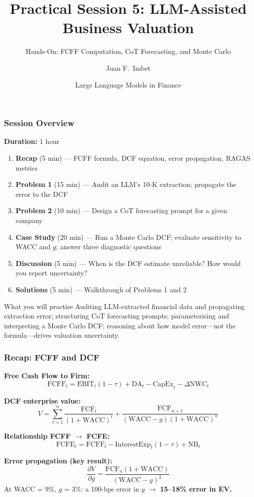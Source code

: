 \documentclass[9pt,t]{beamer}
\title{Practical Session 5: LLM-Assisted Business Valuation}
\subtitle{Hands-On: FCFF Computation, CoT Forecasting, and Monte Carlo}
\author{Juan F.\ Imbet}
\institute{Paris Dauphine -- PSL University}
\date{Large Language Models in Finance}
\begin{document}
\begin{frame}
\frametitle{}
\titlepage
\end{frame}

\begin{frame}
\frametitle{Session Overview}

\textbf{Duration:} 1 hour

\medskip
\begin{enumerate}
  \item \textbf{Recap} (5 min) --- FCFF formula, DCF equation, error propagation, RAGAS metrics
  \item \textbf{Problem 1} (15 min) --- Audit an LLM's 10-K extraction; propagate the error to the DCF
  \item \textbf{Problem 2} (10 min) --- Design a CoT forecasting prompt for a given company
  \item \textbf{Case Study} (20 min) --- Run a Monte Carlo DCF; evaluate sensitivity to WACC and $g$;
        answer three diagnostic questions
  \item \textbf{Discussion} (5 min) --- When is the DCF estimate unreliable? How would you report uncertainty?
  \item \textbf{Solutions} (5 min) --- Walkthrough of Problems 1 and 2
\end{enumerate}

\medskip
\begin{block}{What you will practise}
  Auditing LLM-extracted financial data and propagating extraction error; structuring CoT
  forecasting prompts; parameterising and interpreting a Monte Carlo DCF; reasoning about
  how model error---not the formula---drives valuation uncertainty.
\end{block}
\end{frame}

\begin{frame}
\frametitle{Recap: FCFF and DCF}

\textbf{Free Cash Flow to Firm:}
\[
  \text{FCFF}_t = \text{EBIT}_t(1-\tau) + \text{DA}_t - \text{CapEx}_t - \Delta\text{NWC}_t
\]

\textbf{DCF enterprise value:}
\[
  V = \sum_{t=1}^{n} \frac{\text{FCF}_t}{(1+\text{WACC})^t}
      + \frac{\text{FCF}_{n+1}}{(\text{WACC}-g)(1+\text{WACC})^n}
\]

\textbf{Relationship FCFF $\to$ FCFE:}
\[
  \text{FCFE}_t = \text{FCFF}_t - \text{InterestExp}_t(1-\tau) + \text{NB}_t
\]

\medskip
\textbf{Error propagation (key result):}
\[
  \frac{\partial V}{\partial g} = \frac{\text{FCF}_n(1+\text{WACC})}{(\text{WACC}-g)^2}
\]
At WACC = 9\%, $g$ = 3\%: a 100-bps error in $g$ $\to$ \textbf{15--18\% error in EV.}
\end{frame}
\end{document}
